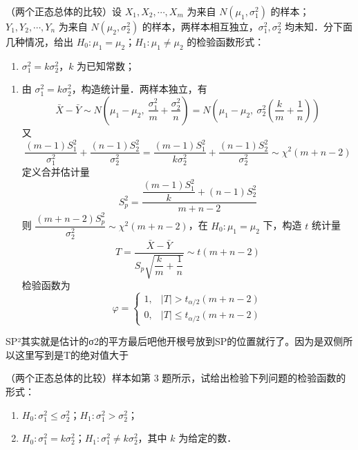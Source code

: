 \begin{homework}[3]
（两个正态总体的比较）设 $X_1, X_2, \cdots, X_m$ 为来自 $N(\mu_1, \sigma_1^2)$ 的样本；$Y_1, Y_2, \cdots, Y_n$ 为来自 $N(\mu_2, \sigma_2^2)$ 的样本，两样本相互独立，$\sigma_1^2, \sigma_2^2$ 均未知．分下面几种情况，给出 $H_0: \mu_1 = \mu_2$；$H_1: \mu_1 \neq \mu_2$ 的检验函数形式：

\begin{enumerate}
   

    \item[(2)] $\sigma_1^2 = k\sigma_2^2$，$k$ 为已知常数；

   
\end{enumerate}
\end{homework}
\begin{solution}
\begin{enumerate}
    \item[(2)] 由 $\sigma_1^2 = k\sigma_2^2$，构造统计量．两样本独立，有
    \[
    \bar{X} - \bar{Y} \sim N\!\left(\mu_1 - \mu_2,\ \frac{\sigma_1^2}{m} + \frac{\sigma_2^2}{n}\right) = N\!\left(\mu_1 - \mu_2,\ \sigma_2^2\!\left(\frac{k}{m} + \frac{1}{n}\right)\right)
    \]
    又
    \[
    \frac{(m-1)S_1^2}{\sigma_1^2} + \frac{(n-1)S_2^2}{\sigma_2^2} = \frac{(m-1)S_1^2}{k\sigma_2^2} + \frac{(n-1)S_2^2}{\sigma_2^2} \sim \chi^2(m+n-2)
    \]
    定义合并估计量
    \[
    S_p^2 = \frac{\dfrac{(m-1)S_1^2}{k} + (n-1)S_2^2}{m+n-2}
    \]
    则 $\dfrac{(m+n-2)S_p^2}{\sigma_2^2} \sim \chi^2(m+n-2)$，在 $H_0: \mu_1 = \mu_2$ 下，构造 $t$ 统计量
    \[
    T = \frac{\bar{X} - \bar{Y}}{S_p\sqrt{\dfrac{k}{m} + \dfrac{1}{n}}} \sim t(m+n-2)
    \]
    检验函数为
    \[
    \varphi = \begin{cases} 1, & |T| > t_{\alpha/2}(m+n-2) \\ 0, & |T| \leqslant t_{\alpha/2}(m+n-2) \end{cases}
    \]
\end{enumerate}
\end{solution}
\begin{dxtips}
    SP²其实就是估计的σ2的平方最后吧他开根号放到SP的位置就行了。因为是双侧所以这里写到是T的绝对值大于
\end{dxtips}
\begin{homework}[4]
（两个正态总体的比较）样本如第 3 题所示，试给出检验下列问题的检验函数的形式：

\begin{enumerate}
    \item[(1)] $H_0: \sigma_1^2 \leqslant \sigma_2^2$；$H_1: \sigma_1^2 > \sigma_2^2$；

    \item[(2)] $H_0: \sigma_1^2 = k\sigma_2^2$；$H_1: \sigma_1^2 \neq k\sigma_2^2$，其中 $k$ 为给定的数．
\end{enumerate}
\end{homework}
